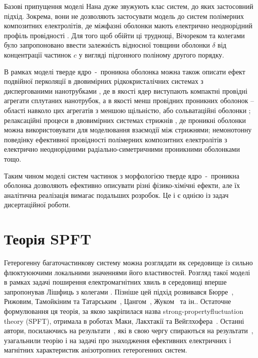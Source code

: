 \documentclass[14pt,twoside]{vakthesis}
\begin{document}
Базові припущення моделі Нана
дуже звужують клас систем, до яких застосовний підхід.
Зокрема, вони не дозволяють застосувати модель до систем полімерних композитних електролітів, де міжфазні оболонки мають електрично неоднорідний профіль провідності \cite{nanocomp2008}.
Для того щоб обійти ці труднощі, Вічореком та колегами~\cite{Wiec1989,Wiec1994,Przl1995} було запропоновано    ввести залежність відносної товщини оболонки $\delta$ від концентрації частинок $c$ у вигляді підгонного поліному другого порядку. 

В рамках моделі тверде ядро~-~проникна оболонка можна також описати ефект подвійної перколяції в двовимірних рідкокристалічних системах з диспергованими нанотрубками \cite{Tomylko2015, Lebovka2017}, де в якості ядер виступають компактні провідні агрегати сплутаних нанотрубок, а в якості  менш провідних проникних оболонок -- області навколо цих агрегатів з меншою щільністю, або сольватаційні оболонки \cite{Lebovka2017}; релаксаційні процеси в двовимірних системах стрижнів \cite{Lebovka2019}, де проникні оболонки можна використовувати для моделювання взаємодії між стрижнями; немонотонну поведінку ефективної провідності полімерних композитних електролітів з електрично неоднорідними радіально-симетричними проникними оболонками \cite{nanocomp2008} тощо. 

Таким чином моделі систем частинок з морфологією тверде ядро~-~проникна оболонка дозволяють ефективно описувати різні фізико-хімічні ефекти, але їх аналітична реалізація вимагає подальших розробок. Це і є однією із задач дисертаційної роботи.


\section{Теорія SPFT}\label{sec:SPFT}

Гетерогенну багаточастинкову систему можна розглядати як середовище із сильно флюктуюючими локальними значеннями його властивостей. Розгляд такої моделі в рамках задачі поширення електромагнітних хвиль в середовищі вперше запропонував Лішфиць з колегами \cite{Lifshitz1950}. Пізніше цей підхід розвивався Бюрре~\cite{Bourret1962}, Рижовим, Тамойкіним та Татарським~\cite{Ryzhov1965,
RyzhovRev}, Цангом~\cite{Tsang1981}, Жуком~\cite{Zhuk1994} та ін..
Остаточне формулювання ця теорія, за якою закріпилася назва  strong-propertyfluctuation
theory (SPFT), отримала в роботах Маки, Лакхтакії та Вейглхофера~\cite{Michel1995,Mackay2000, Mackay2001}.
Останні автори, посилаючись на результати~\cite{Tsang1981}, які в свою чергу спираються на результати~\cite{Ryzhov1965, RyzhovRev}, узагальнили  теорію і на задачі про знаходження ефективних електричних і магнітних характеристик анізотропних гетерогенних систем.
\end{document}
